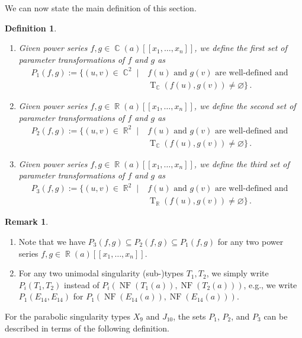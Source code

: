 \documentclass[noend]{amsproc}
\newtheorem{defn}[theorem]{Definition}
\theoremstyle{definition}
\newtheorem{remark}[theorem]{Remark}
\newcommand{\NF}[1]{\operatorname{NF}(#1)}
\DeclareMathOperator{\R}{\mathbb{R}}
\DeclareMathOperator{\C}{\mathbb{C}}
\DeclareMathOperator{\T}{T}
\begin{document}
We can now state the main definition of this section.

\begin{defn}
\leavevmode
\begin{enumerate}
\item
Given power series $f,g \in \C(a)[[x_1,\ldots,x_n]]$, we define the
first set of parameter transformations of $f$ and $g$ as
\begin{align*}
P_1(f, g)
:= \{ (u, v) \in \C^2 \mid
&f(u) \text{ and } g(v) \text{ are well-defined and } \\
&\T_{\C}(f(u), g(v)) \neq \varnothing \} \,.
\end{align*}

\item
Given power series $f,g \in \R(a)[[x_1,\ldots,x_n]]$, we define the
second set of parameter transformations of $f$ and $g$ as
\begin{align*}
P_2(f, g)
:= \{ (u, v) \in \R^2 \mid
&f(u) \text{ and } g(v) \text{ are well-defined and } \\
&\T_{\C}(f(u), g(v)) \neq \varnothing \} \,.
\end{align*}

\item
Given power series $f,g \in \R(a)[[x_1,\ldots,x_n]]$, we define the
third set of parameter transformations of $f$ and $g$ as
\begin{align*}
P_3(f, g)
:= \{ (u, v) \in \R^2 \mid
&f(u) \text{ and } g(v) \text{ are well-defined and } \\
&\T_{\R}(f(u), g(v)) \neq \varnothing \} \,.
\end{align*}
\end{enumerate}
\end{defn}

\begin{remark}
\leavevmode
\begin{enumerate}
\item
Note that we have $P_3(f, g) \subseteq P_2(f, g) \subseteq P_1(f, g)$ for any
two power series $f,g \in \R(a)[[x_1,\ldots,x_n]]$.

\item
For any two unimodal singularity (sub-)types $T_1, T_2$, we simply write
$P_i(T_1,T_2)$ instead of $P_i(\NF{T_1(a)}, \NF{T_2(a)})$, e.g., we write
$P_1(E_{14}, E_{14})$ for $P_1(\NF{E_{14}(a)}, \NF{E_{14}(a)})$.
\end{enumerate}
\end{remark}

For the parabolic singularity types $X_9$ and $J_{10}$, the sets $P_1$, $P_2$,
and $P_3$ can be described in terms of the following definition.
\end{document}
